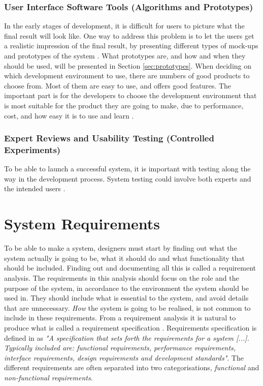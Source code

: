 \subsubsection{User Interface Software Tools (Algorithms and Prototypes)}
In the early stages of development, it is difficult for users to picture what the final result will look like. One way to address this problem is to let the users get a realistic impression of the final result, by presenting different types of mock-ups and prototypes of the system \cite{mmi}. What prototypes are, and how and when they should be used, will be presented in Section \ref{sec:prototypes}. When deciding on which development environment to use, there are numbers of good products to choose from. Most of them are easy to use, and offers good features. The important part is for the developers to choose the development environment that is most suitable for the product they are going to make, due to performance, cost, and how easy it is to use and learn \cite{mmi}.
	
\subsubsection{Expert Reviews and Usability Testing (Controlled Experiments)}
To be able to launch a successful system, it is important with testing along the way in the development process. System testing could involve both experts and the intended users \cite{mmi}. 

\section{System Requirements}
\label{sec:systemreq}
To be able to make a system, designers must start by finding out what the system actually is going to be, what it should do and what functionality that should be included. Finding out and documenting all this is called a requirement analysis. The requirements in this analysis should focus on the role and the purpose of the system, in accordance to the environment the system should be used in. They should include what is essential to the system, and avoid details that are unnecessary. \emph{How} the system is going to be realised, is not common to include in these requirements. From a requirement analysis it is natural to produce what is called a requirement specification \cite{braude2000software}. Requirements specification is defined in \cite{systemutviklingDel1} as \emph{"A specification that sets forth the requirements for a system [...]. Typically included are: functional requirements, performance requirements, interface requirements, design requirements and development standards"}. The different requirements are often separated into two categorisations, \emph{functional} and \emph{non-functional requirements}. 

